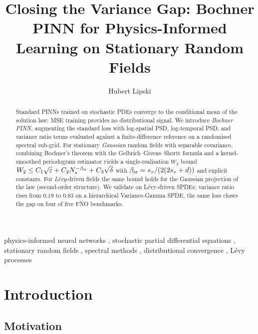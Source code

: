 \documentclass[10pt]{elsarticle}
\begin{document}
\begin{frontmatter}

\title{Closing the Variance Gap: Bochner PINN for Physics-Informed Learning on Stationary Random Fields}

\author{Hubert Lipski}

\begin{abstract}
Standard PINNs trained on stochastic PDEs converge to the conditional
mean of the solution law; MSE training provides no distributional
signal.
We introduce \emph{Bochner PINN}, augmenting the standard loss with
log-spatial PSD, log-temporal PSD, and variance ratio terms evaluated
against a finite-difference reference on a randomised spectral
sub-grid.
For stationary \emph{Gaussian} random fields with separable covariance,
combining Bochner's theorem with the Gelbrich--Givens--Shortt formula
and a kernel-smoothed periodogram estimator yields a single-realisation
$W_2$ bound
\(W_2 \le C_1\sqrt{\varepsilon} + C_2 N_s^{-\beta_{\rm sr}} +
C_3\sqrt{\delta}\) with $\beta_{\rm sr} = s_x/(2(2s_x+d))$
and explicit constants. For \emph{L\'evy}-driven fields the same
bound holds for the Gaussian projection of the law (second-order
structure).
We validate on L\'evy-driven SPDEs: variance ratio rises from
\(0.19\) to \(0.83\) on a hierarchical Variance-Gamma SPDE, the same
loss closes the gap on four of five FNO benchmarks.
\end{abstract}

\begin{keyword}
physics-informed neural networks \sep
stochastic partial differential equations \sep
stationary random fields \sep
spectral methods \sep
distributional convergence \sep
L\'evy processes
\end{keyword}

\end{frontmatter}

\section{Introduction}
\label{sec:intro}

\subsection{Motivation}
\label{subsec:motivation}
\end{document}
